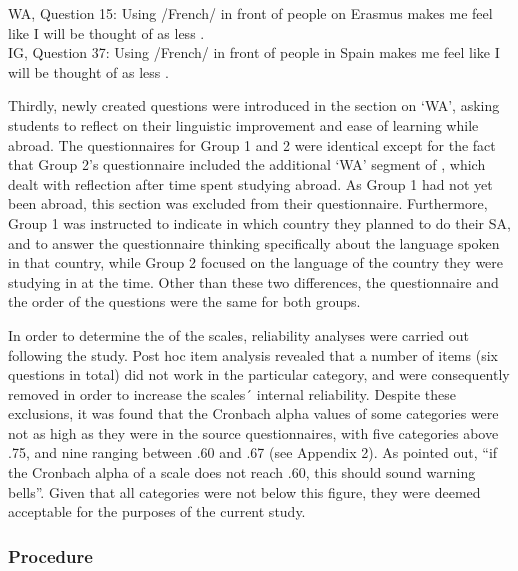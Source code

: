 \documentclass[output=paper]{langsci/langscibook}
\begin{document}
\ea
{WA, Question 15: Using /French/ in front of people on Erasmus makes me feel like I will be thought of as less .} \\
{IG, Question 37: Using /French/ in front of people in Spain makes me feel like I will be thought of as less .}\\
\z

Thirdly, newly created questions were introduced in the section on ‘WA’, asking students to reflect on their {linguistic} improvement and ease of learning while abroad. The questionnaires for Group 1 and 2 were identical except for the fact that Group 2’s questionnaire included the additional ‘WA’ segment of , which dealt with reflection after time spent studying abroad. As Group 1 had not yet been abroad, this section was excluded from their questionnaire. Furthermore, Group 1 was instructed to indicate in which country they planned to do their SA, and to answer the questionnaire thinking specifically about the language spoken in that country, while Group 2 focused on the language of the country they were studying in at the time. Other than these two differences, the questionnaire and the order of the questions were the same for both groups.    

In order to determine the  of the scales, reliability analyses were carried out following the study. Post hoc item analysis revealed that a number of items (six questions in total) did not work in the particular category, and were consequently removed in order to increase the scales´ internal reliability. Despite these exclusions, it was found that the Cronbach alpha values of some categories were not as high as they were in the source questionnaires, with five categories above .75, and nine ranging between .60 and .67 (see Appendix 2). As  \citet[95]{DörnyeiTaguchi2009} pointed out, “if the Cronbach alpha of a scale does not reach .60, this should sound warning bells”. Given that all categories were not below this figure, they were deemed acceptable for the purposes of the current study.


\subsubsection{Procedure}
\end{document}
